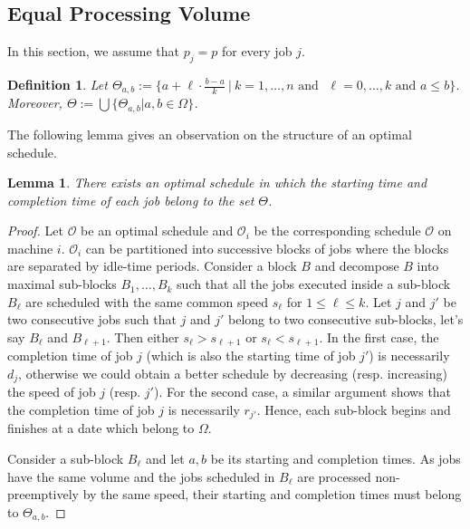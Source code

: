\documentclass[11pt,a4paper]{article}
\newtheorem{lemma}{Lemma}
\newtheorem{definition}{Definition}
\begin{document}
\subsection{Equal Processing Volume}


In this section, we assume that $p_{j}=p$ for every job $j$.

\begin{definition}\label{def:Theta_x_y}
Let $\Theta_{a,b} :=\{a+ \ell \cdot \frac{b-a}{k} ~|~ k = 1,\ldots ,n \mbox{ and }$ 
$ \ell = 0,\ldots ,k \mbox{ and } a\le b
 \}$. Moreover, $\Theta :=\bigcup\{\Theta_{a,b} | a,b\in\Omega\}$.
\end{definition}


The following lemma gives an observation on the structure of an optimal 
schedule.

\begin{lemma}\label{theta}
There exists an optimal schedule in which the starting time and completion time
of each job belong to the set $\Theta$.
\end{lemma}
\begin{proof}
Let $\mathcal{O}$ be an optimal schedule and $\mathcal{O}_i$
be the corresponding schedule $\mathcal{O}$ on machine $i$.
$\mathcal{O}_i$ can be partitioned into successive blocks
of jobs where the blocks are separated by idle-time periods. 
Consider a block $B$ and decompose
$B$ into maximal sub-blocks $B_1,\ldots , B_{k}$ such 
that all the jobs executed inside a sub-block $B_{\ell}$ are scheduled with
the same common speed $s_{\ell}$ for $1 \leq \ell \leq k$. 
Let $j$ and ${j'}$ be two consecutive jobs such
that $j$ and ${j'}$ belong to two consecutive sub-blocks, let's say $B_{\ell}$ and 
$B_{\ell+1}$. Then either $s_{\ell}> s_{\ell+1}$ or $s_{\ell} < s_{\ell+1}$.
In the first case, the completion time of job $j$ (which is also the starting time
of job ${j'}$) is necessarily $d_j$, otherwise we could obtain a better schedule
by decreasing (resp. increasing) the speed of job $j$ (resp. ${j'}$).
For the second case, a similar argument shows that the completion time of job $j$
is necessarily $r_{j'}$. Hence, each sub-block begins and finishes at a date which belong to $\Omega$. 

Consider a sub-block $B_{\ell}$ and let $a,b$ be its starting and completion times. 
As jobs have the same volume and 
the jobs scheduled in $B_{\ell}$ are processed non-preemptively by the same speed, 
their starting and completion times must belong to $\Theta_{a,b}$.
\end{proof}
\end{document}
